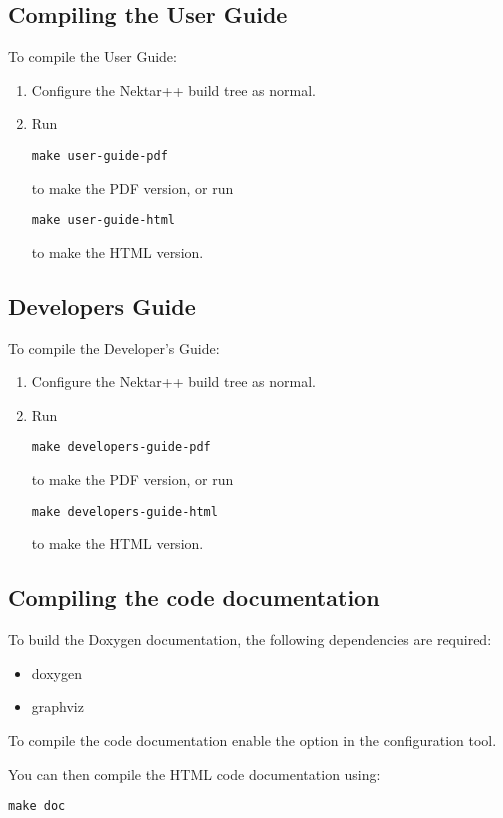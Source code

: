 \subsection{Compiling the User Guide}
To compile the User Guide:
\begin{enumerate}
    \item Configure the Nektar++ build tree as normal.
    \item Run
    \begin{lstlisting}[style=BashInputStyle]
    make user-guide-pdf
    \end{lstlisting}
    to make the PDF version, or run
    \begin{lstlisting}[style=BashInputStyle]
    make user-guide-html
    \end{lstlisting}
    to make the HTML version.
\end{enumerate}


\subsection{Developers Guide}
To compile the Developer's Guide:
\begin{enumerate}
    \item Configure the Nektar++ build tree as normal.
    \item Run
    \begin{lstlisting}[style=BashInputStyle]
    make developers-guide-pdf
    \end{lstlisting}
    to make the PDF version, or run
    \begin{lstlisting}[style=BashInputStyle]
    make developers-guide-html
    \end{lstlisting}
    to make the HTML version.
\end{enumerate}

\subsection{Compiling the code documentation}
To build the Doxygen documentation, the following dependencies are required:
\begin{itemize}
    \item doxygen
    \item graphviz
\end{itemize}

To compile the code documentation enable the  option
in the  configuration tool.

You can then compile the HTML code documentation using:
\begin{lstlisting}[style=BashInputStyle]
make doc
\end{lstlisting}


